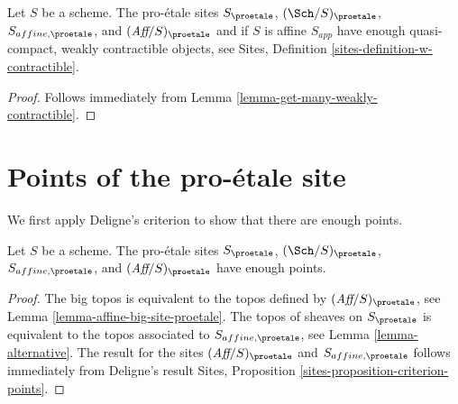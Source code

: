 \begin{lemma}
\label{lemma-proetale-enough-w-contractible}
Let $S$ be a scheme. The pro-\'etale sites
$S_\proetale$, $(\Sch/S)_\proetale$, $S_{affine, \proetale}$, and
$(\textit{Aff}/S)_\proetale$ and if $S$ is affine $S_{app}$
have enough quasi-compact, weakly contractible
objects, see Sites, Definition \ref{sites-definition-w-contractible}.
\end{lemma}

\begin{proof}
Follows immediately from Lemma \ref{lemma-get-many-weakly-contractible}.
\end{proof}







\section{Points of the pro-\'etale site}
\label{section-points}

\noindent
We first apply Deligne's criterion to show that there are enough points.

\begin{lemma}
\label{lemma-points-proetale}
Let $S$ be a scheme. The pro-\'etale sites
$S_\proetale$, $(\Sch/S)_\proetale$, $S_{affine, \proetale}$, and
$(\textit{Aff}/S)_\proetale$ have enough points.
\end{lemma}

\begin{proof}
The big topos is equivalent to the topos defined by
$(\textit{Aff}/S)_\proetale$, see
Lemma \ref{lemma-affine-big-site-proetale}.
The topos of sheaves on $S_\proetale$ is equivalent to the topos
associated to $S_{affine, \proetale}$, see
Lemma \ref{lemma-alternative}.
The result for the sites $(\textit{Aff}/S)_\proetale$ and
$S_{affine, \proetale}$ follows immediately from Deligne's result
Sites, Proposition \ref{sites-proposition-criterion-points}.
\end{proof}

